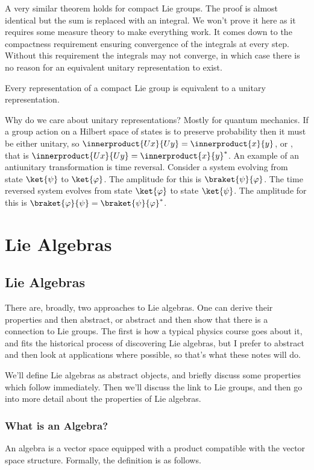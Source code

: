\documentclass[fleqn]{NotesClass}
\begin{document}
    A very similar theorem holds for compact Lie groups.
    The proof is almost identical but the sum is replaced with an integral.
    We won't prove it here as it requires some measure theory to make everything work.
    It comes down to the compactness requirement ensuring convergence of the integrals at every step.
    Without this requirement the integrals may not converge, in which case there is no reason for an equivalent unitary representation to exist.
    \begin{thm}{}{}
        Every representation of a compact Lie group is equivalent to a unitary representation.
    \end{thm}
    
    Why do we care about unitary representations?
    Mostly for quantum mechanics.
    If a group action on a Hilbert space of states is to preserve probability then it must be either unitary, so \(\innerproduct{Ux}{Uy} = \innerproduct{x}{y}\), or , that is \(\innerproduct{Ux}{Uy} = \innerproduct{x}{y}^*\).
    An example of an antiunitary transformation is time reversal.
    Consider a system evolving from state \(\ket{\psi}\) to \(\ket{\varphi}\).
    The amplitude for this is \(\braket{\psi}{\varphi}\).
    The time reversed system evolves from state \(\ket{\varphi}\) to state \(\ket{\psi}\).
    The amplitude for this is \(\braket{\varphi}{\psi} = \braket{\psi}{\varphi}^*\).
    
    \part{Lie Algebras}
    \chapter{Lie Algebras}
    There are, broadly, two approaches to Lie algebras.
    One can derive their properties and then abstract, or abstract and then show that there is a connection to Lie groups.
    The first is how a typical physics course goes about it, and fits the historical process of discovering Lie algebras, but I prefer to abstract and then look at applications where possible, so that's what these notes will do.
    
    We'll define Lie algebras as abstract objects, and briefly discuss some properties which follow immediately.
    Then we'll discuss the link to Lie groups, and then go into more detail about the properties of Lie algebras.
    
    \section{What is an Algebra?}
    An algebra is a vector space equipped with a product compatible with the vector space structure.
    Formally, the definition is as follows.
    
\end{document}

